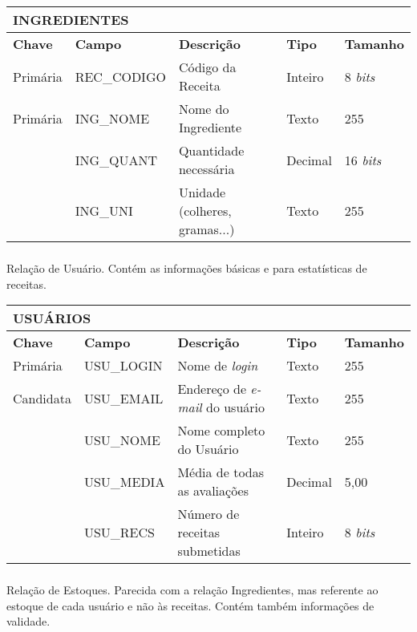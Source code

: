 \documentclass[a4paper]{article}
\begin{document}
\begin{center}
\begin{tabular}{ l  l  l  l l }
  \multicolumn{5}{l}{\textbf{INGREDIENTES}} \\
  \hline
  \textbf{Chave} & \textbf{Campo} & \textbf{Descrição} & \textbf{Tipo} & \textbf{Tamanho} \\
  \cline{1-5}
  Primária & REC\_CODIGO & Código da Receita & Inteiro & 8 \emph{bits}  \\
  Primária & ING\_NOME & Nome do Ingrediente & Texto & 255 \\
   & ING\_QUANT & Quantidade necessária & Decimal & 16 \emph{bits} \\
   & ING\_UNI & Unidade (colheres, gramas...) & Texto & 255
\end{tabular}
\end{center}

\newpage

\subsubsection{} Relação de Usuário. Contém as informações básicas e para estatísticas de receitas.

\begin{center}
\begin{tabular}{ l  l  l  l l }
  \multicolumn{5}{l}{\textbf{USUÁRIOS}} \\
  \hline
  \textbf{Chave} & \textbf{Campo} & \textbf{Descrição} & \textbf{Tipo} & \textbf{Tamanho} \\
  \cline{1-5}
   Primária & USU\_LOGIN & Nome de \emph{login} & Texto & 255 \\
   Candidata & USU\_EMAIL & Endereço de \emph{e-mail} do usuário & Texto & 255 \\
   & USU\_NOME & Nome completo do Usuário & Texto & 255 \\
   & USU\_MEDIA & Média de todas as avaliações & Decimal & 5,00 \\
   & USU\_RECS & Número de receitas submetidas & Inteiro & 8 \emph{bits}
\end{tabular}
\end{center}

\vfill

\subsubsection{} Relação de Estoques. Parecida com a relação Ingredientes, mas referente ao estoque de cada usuário e não às receitas. Contém também informações de validade.
\end{document}
